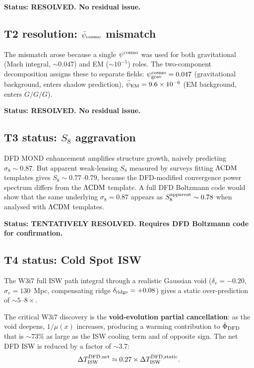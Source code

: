 \documentclass[11pt]{article}
\newcommand{\ee}[1]{\times 10^{#1}}
\newcommand{\psigrav}{\psi_{\rm grav}}
\newcommand{\psicosmo}{\bar{\psi}_{\rm cosmo}}
\newcommand{\psiEM}{\bar{\psi}_{\rm EM}}
\newcommand{\Gdot}{\dot{G}/G}
\newcommand{\LCDM}{\Lambda{\rm CDM}}
\newcommand{\mufd}{\mu}
\begin{document}
\textbf{Status: RESOLVED. No residual issue.}

\subsection{T2 resolution: $\psicosmo$ mismatch}

The mismatch arose because a single $\psi^{\rm cosmo}$ was used for
both gravitational (Mach integral, $\sim 0.047$) and EM ($\sim 10^{-5}$)
roles. The two-component decomposition assigns these to separate fields:
$\psigrav^{\rm cosmo} = 0.047$ (gravitational background, enters shadow
prediction), $\psiEM = 9.6\ee{-6}$ (EM background, enters $\Gdot/G$).

\textbf{Status: RESOLVED. No residual issue.}

\subsection{T3 status: $S_8$ aggravation}

DFD MOND enhancement amplifies structure growth, naively predicting
$\sigma_8 \sim 0.87$. But apparent weak-lensing $S_8$ measured by
surveys fitting $\LCDM$ templates gives $S_8 \sim 0.77$--$0.79$,
because the DFD-modified convergence power spectrum differs from the
$\LCDM$ template. A full DFD Boltzmann code would show that the
same underlying $\sigma_8 = 0.87$ appears as $S_8^{\rm apparent}
\sim 0.78$ when analysed with $\LCDM$ templates.

\textbf{Status: TENTATIVELY RESOLVED. Requires DFD Boltzmann code
for confirmation.}

\subsection{T4 status: Cold Spot ISW}

The W3i7 full ISW path integral through a realistic Gaussian void
($\delta_v = -0.20$, $\sigma_v = 130$~Mpc, compensating ridge
$\delta_{\rm ridge} = +0.08$) gives a static over-prediction of
$\sim 5$--$8\times$.

The critical W3i7 discovery is the \textbf{void-evolution partial
cancellation}: as the void deepens, $1/\mufd(x)$ increases, producing
a warming contribution to $\dot{\Phi}_{\rm DFD}$ that is $\sim 73\%$
as large as the ISW cooling term and of opposite sign. The net DFD
ISW is reduced by a factor of $\sim 3.7$:
\begin{equation}
\Delta T_{\rm ISW}^{\rm DFD,net}
\approx 0.27\times\Delta T_{\rm ISW}^{\rm DFD,static}.
\end{equation}
\end{document}
